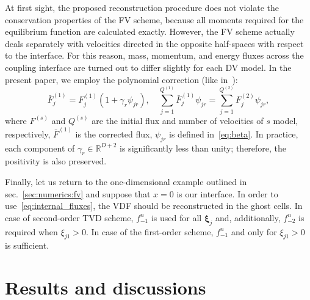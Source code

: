 \documentclass[]{elsarticle} %
\newcommand{\bxi}{\boldsymbol{\xi}}
\newcommand{\bxia}{\bxi_j}
\begin{document}
{%
At first sight, the proposed reconstruction procedure does not violate the conservation properties of the FV scheme,
because all moments required for the equilibrium function are calculated exactly.
However, the FV scheme actually deals separately with velocities
directed in the opposite half-spaces with respect to the interface.
For this reason, mass, momentum, and energy fluxes across the coupling interface
are turned out to differ slightly for each DV model.
In the present paper, we employ the polynomial correction (like in~\cite{Aristov1980}):
\begin{equation}\label{eq:poly_correction}
    \bar{F}^{(1)}_j = F^{(1)}_j(1+\gamma_r\psi_{j r}), \quad
    \sum_{j=1}^{Q^{(1)}} \bar{F}^{(1)}_j\psi_{j r} = \sum_{j=1}^{Q^{(2)}} F^{(2)}_j\psi_{j r},
\end{equation}
where \(F^{(s)}\) and \(Q^{(s)}\) are the initial flux and number of velocities of \(s\) model, respectively,
\(\bar{F}^{(1)}\) is the corrected flux, \(\psi_{j r}\) is defined in~\eqref{eq:beta}.
In practice, each component of \(\gamma_r\in\mathbb{R}^{D+2}\) is significantly less than unity;
therefore, the positivity is also preserved.

Finally, let us return to the one-dimensional example outlined in sec.~\ref{sec:numerics:fv}
and suppose that \(x=0\) is our interface.
In order to use~\eqref{eq:internal_fluxes}, the VDF should be reconstructed in the ghost cells.
In case of second-order TVD scheme, \(f_{-1}^n\) is used for all \(\bxia\) and, additionally,
\(f_{-2}^n\) is required when \(\xi_{j1}>0\).
In case of the first-order scheme, \(f_{-1}^n\) and only for \(\xi_{j1}>0\) is sufficient.

\section{Results and discussions}\label{sec:results}

}
\end{document}
